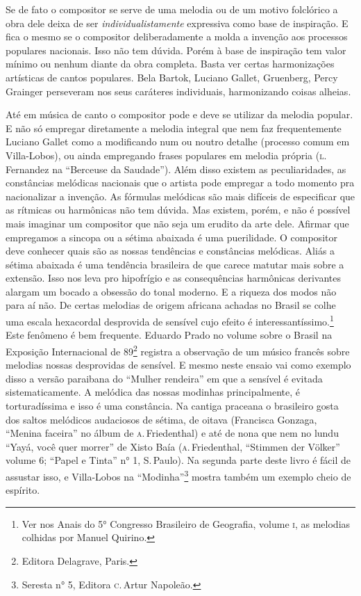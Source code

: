Se de fato o compositor se serve de uma melodia ou de um motivo
folclórico a obra dele deixa de ser \textit{individualistamente} expressiva como
base de inspiração. E fica o mesmo se o compositor deliberadamente a
molda a invenção aos processos populares nacionais. Isso não tem dúvida.
Porém à base de inspiração tem valor mínimo ou nenhum diante da obra
completa. Basta ver certas harmonizações artísticas de cantos populares.
Bela Bartok, Luciano Gallet, Gruenberg, Percy Grainger perseveram nos
seus caráteres individuais, harmonizando coisas alheias.

Até em música de canto o compositor pode e deve se utilizar da melodia
popular. E não só empregar diretamente a melodia integral que nem faz
frequentemente Luciano Gallet como a modificando num ou noutro detalhe
(processo comum em Villa-Lobos), ou ainda empregando frases populares em
melodia própria (\textsc{l}.\,Fernandez na ``Berceuse da Saudade''). Além disso
existem as peculiaridades, as constâncias melódicas nacionais que o
artista pode empregar a todo momento pra nacionalizar a invenção. As
fórmulas melódicas são mais difíceis de especificar que as rítmicas ou
harmônicas não tem dúvida. Mas existem, porém, e não é possível mais
imaginar um compositor que não seja um erudito da arte dele. Afirmar que
empregamos a sincopa ou a sétima abaixada é uma puerilidade. O
compositor deve conhecer quais são as nossas tendências e constâncias
melódicas. Aliás a sétima abaixada é uma tendência brasileira de que
carece matutar mais sobre a extensão. Isso nos leva pro hipofrígio e as
consequências harmônicas derivantes alargam um bocado a obsessão do
tonal moderno. E a riqueza dos modos não para aí não. De certas melodias
de origem africana achadas no Brasil se colhe uma escala hexacordal
desprovida de sensível cujo efeito é interessantíssimo.\footnote{Ver nos Anais do
5° Congresso Brasileiro de Geografia, volume \textsc{i}, as melodias colhidas por
Manuel Quirino.} Este fenômeno é bem frequente. Eduardo Prado no volume
sobre o Brasil na Exposição Internacional de 89\footnote{Editora Delagrave, Paris.} 
registra a observação de um músico francês sobre melodias nossas
desprovidas de sensível. E mesmo neste ensaio vai como exemplo disso a
versão paraibana do ``Mulher rendeira'' em que a sensível é evitada
sistematicamente. A melódica das nossas modinhas principalmente, é
torturadíssima e isso é uma constância. Na cantiga praceana o brasileiro
gosta dos saltos melódicos audaciosos de sétima, de oitava (Francisca
Gonzaga, ``Menina faceira'' no álbum de \textsc{a}.\,Friedenthal) e até de nona que
nem no lundu ``Yayá, você quer morrer'' de Xisto Baía (\textsc{a}.\,Friedenthal,
``Stimmen der Völker'' volume 6; ``Papel e Tinta'' n° 1, S.\,Paulo). Na segunda
parte deste livro é fácil de assustar isso, e Villa-Lobos na ``Modinha''\footnote{Seresta n° 5, Editora \textsc{c}.\,Artur Napoleão.} mostra também um exemplo cheio de
espírito.

